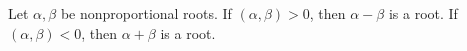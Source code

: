 Let $\alpha, \beta$ be nonproportional roots. If $(\alpha, \beta) > 0$, then $\alpha - \beta$ is a root. If $(\alpha, \beta) < 0$, then $\alpha + \beta$ is a root.
